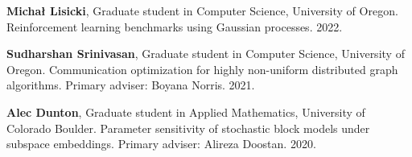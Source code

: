 \item \textbf{Micha{\l} Lisicki},
      Graduate student in Computer Science,
      University of Oregon.
      Reinforcement learning benchmarks using Gaussian processes.
      2022.


\item \textbf{Sudharshan Srinivasan},
      Graduate student in Computer Science,
      University of Oregon.
      Communication optimization for highly non-uniform distributed graph algorithms.
      Primary adviser: Boyana Norris.
      2021.

\item \textbf{Alec Dunton},
      Graduate student in Applied Mathematics,
      University of Colorado Boulder.
      Parameter sensitivity of stochastic block models under subspace embeddings.
      Primary adviser: Alireza Doostan.
      2020.
